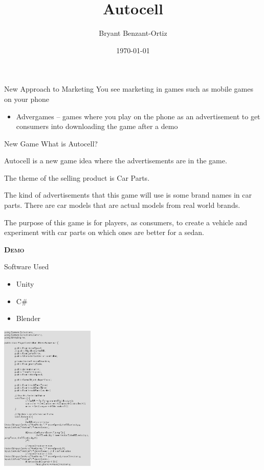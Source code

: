 \documentclass[12pt]{beamer}
\title{Autocell}
\author{Bryant Benzant-Ortiz}
\date{\today}
\begin{document}
\begin{frame}
  \titlepage
\end{frame}

\begin{frame}{New Approach to Marketing}
	You see marketing in games such as mobile games on your phone
	\begin{itemize}
		\item Advergames -- games where you play on the phone as an advertisement to get consumers into downloading the game after a demo
	\end{itemize}
\end{frame}

\begin{frame}{New Game}
	What is Autocell?

	Autocell is a new game idea where the advertisements are in the game.

	The theme of the selling product is Car Parts.

	The kind of advertisements that this game will use is some brand names in car parts. There are car models that are actual models from real world brands. 

	The purpose of this game is for players, as consumers, to create a vehicle and experiment with car parts on which ones are better for a sedan.
\end{frame}
%	
\begin{frame}{}
	\centering\textsc{\textbf{Demo}}
\end{frame}
\begin{frame}{Software Used}
	\begin{multicols}{2}
	\begin{itemize}[nosep,noitemsep]
		\item Unity
		\item C\#
		\item Blender
	\end{itemize}
	\includegraphics[height=2.75in]{Code}
	\end{multicols}
\end{frame}
\end{document}
